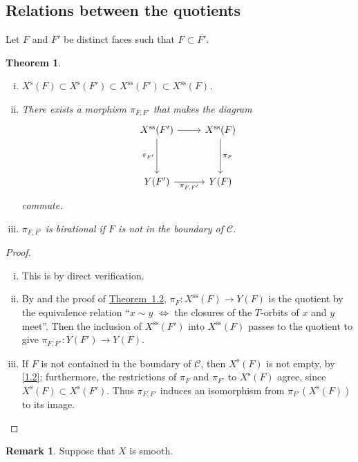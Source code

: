\documentclass{article}
\theoremstyle{plain}
\newtheorem*{theorem}{Theorem}
\theoremstyle{definition}
\newtheorem*{remark}{Remark}
\newcommand{\s}{\mathrm{s}}
\renewcommand{\ss}{\mathrm{ss}}
\newcommand{\oldpage}[1]{\marginpar{\footnotesize$\Big\vert$ \textit{p.~#1}}}
\begin{document}
\subsection{Relations between the quotients}
\label{1.4}

Let $F$ and $F'$ be distinct faces such that $F\subset\overline{F'}$.

\begin{theorem}
  \begin{enumerate}[(i)]
    \item $X^\s(F) \subset X^\s(F') \subset X^\ss(F') \subset X^\ss(F)$.
    \item There exists a morphism $\pi_{F,F'}$ that makes the diagram
      \[
        \begin{tikzcd}[row sep=huge]
          X^\ss(F') \rar \dar[swap,"\pi_{F'}"]
          & X^\ss(F) \dar["\pi_F"]
        \\Y(F') \rar[swap,"\pi_{F,F'}"]
          & Y(F)
        \end{tikzcd}
      \]
      commute.
    \item $\pi_{F,F'}$ is birational if $F$ is not in the boundary of $\mathcal{C}$.
  \end{enumerate}
\end{theorem}

\oldpage{515}
\begin{proof}
  \begin{enumerate}[(i)]
    \item This is by direct verification.
    \item By \cite[1.11]{MF} and the proof of \hyperref[1.2-theorem]{Theorem~1.2}, $\pi_F\colon X^\ss(F)\to Y(F)$ is the quotient by the equivalence relation ``$x\sim y$ $\iff$ the closures of the $T$-orbits of $x$ and $y$ meet''.
      Then the inclusion of $X^\ss(F')$ into $X^\ss(F)$ passes to the quotient to give $\pi_{F,F'}\colon Y(F')\to Y(F)$.
    \item If $F$ is not contained in the boundary of $\mathcal{C}$, then $X^\s(F)$ is not empty, by \cref{1.2};
      furthermore, the restrictions of $\pi_F$ and $\pi_{F'}$ to $X^\s(F)$ agree, since $X^\s(F)\subset X^\s(F')$.
      Thus $\pi_{F,F'}$ induces an isomorphism from $\pi_{F'}(X^\s(F))$ to its image.
  \end{enumerate}
\end{proof}

\begin{remark}
  Suppose that $X$ is smooth.
\end{remark}
\end{document}
